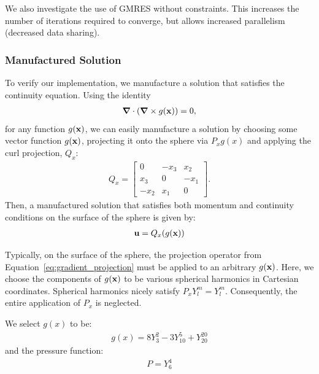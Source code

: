 We also investigate the use of GMRES without constraints. This increases the number of iterations required to converge, but allows increased parallelism (decreased data sharing). %

\subsubsection{Manufactured Solution}

To verify our implementation, we manufacture a solution that satisfies the continuity equation. Using the identity
\begin{align*} 
\mbox{\boldmath$ \nabla $} \cdot (\mbox{\boldmath$ \nabla $} \times g(\mathbf{x})) = 0,
\end{align*} 
for any function $g(\mathbf{x})$, we can easily manufacture a solution by choosing some vector function $g(\mathbf{x})$, projecting it onto the sphere via $P_x g(x)$ and applying the curl projection, $Q_x$: 
\begin{align*} 
Q_x = \begin{bmatrix} 0 & -x_3 & x_2 \\ x_3 & 0 & -x_1 \\ -x_2 & x_1 & 0 \end{bmatrix}.
\end{align*} 
Then, a manufactured solution that satisfies both momentum and continuity conditions on the surface of the sphere is given by: 
\begin{align*} 
\mathbf{u} = Q_x (g(\mathbf{x}))
\end{align*} 

Typically, on the surface of the sphere, the projection operator from Equation~\ref{eq:gradient_projection} must be applied to an arbitrary $g(\mathbf{x})$. 
Here, we choose the components of $g(\mathbf{x})$ to be various spherical harmonics in Cartesian coordinates. Spherical harmonics nicely satisfy $P_x Y_l^m = Y_l^m$. Consequently, the entire application of $P_x$ is neglected. 



We select $g(x)$ to be: 
\begin{align}
g(x) = 8 Y_{3}^{2} - 3Y_{10}^{5} + Y_{20}^{20} 
\end{align}
and the pressure function:
\begin{align}
P = Y_6^4 
\end{align} 

